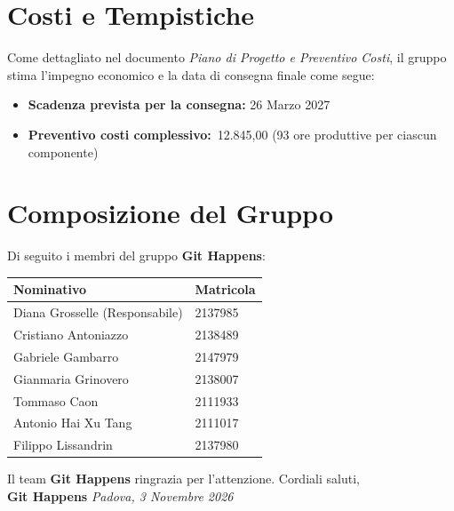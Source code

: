 \section*{Costi e Tempistiche}
Come dettagliato nel documento \textit{Piano di Progetto e Preventivo Costi}, il gruppo stima l'impegno economico e la data di consegna finale come segue:
\begin{itemize}
    \item \textbf{Scadenza prevista per la consegna:} 26 Marzo 2027
    \item \textbf{Preventivo costi complessivo:} \geneuro\,12.845,00 (93 ore produttive per ciascun componente)
\end{itemize}
\vspace{0.6cm}
\section*{Composizione del Gruppo}
Di seguito i membri del gruppo \textbf{Git Happens}:
\vspace{0.3cm}

\begin{tabularx}{\textwidth}{@{} X l @{}}
    \toprule
    \textbf{Nominativo} & \textbf{Matricola} \\
    \midrule
    Diana Grosselle (Responsabile) & 2137985 \\
    \addlinespace[0.15cm]
    Cristiano Antoniazzo & 2138489 \\
    \addlinespace[0.15cm]
    Gabriele Gambarro & 2147979 \\
    \addlinespace[0.15cm]
    Gianmaria Grinovero & 2138007 \\
    \addlinespace[0.15cm]
    Tommaso Caon & 2111933 \\
    \addlinespace[0.15cm]
    Antonio Hai Xu Tang & 2111017 \\
    \addlinespace[0.15cm]
    Filippo Lissandrin & 2137980 \\
    \bottomrule
\end{tabularx}
\vspace{0.3cm}


Il team \textbf{Git Happens} ringrazia per l'attenzione.
\vspace{0.4cm}
\noindent
Cordiali saluti, \\
\textbf{Git Happens}
\vspace{0.5cm}
\noindent
\textit{Padova, 3 Novembre 2026}
